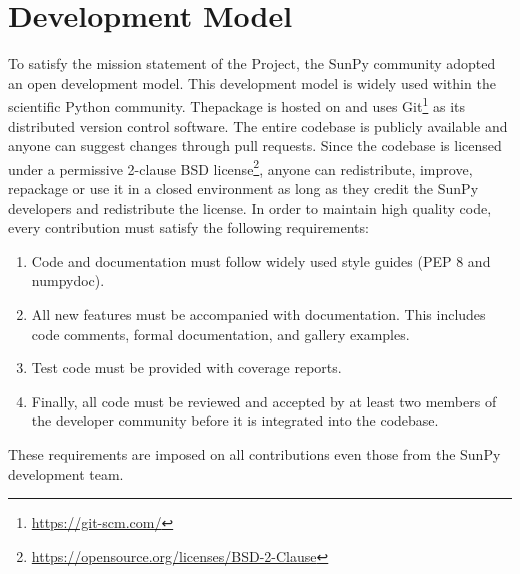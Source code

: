\section{Development Model}
\label{sec:development}

To satisfy the mission statement of the Project, the SunPy community adopted an open development model.
This development model is widely used within the scientific Python community.
The\sunpypkg package is hosted on \github and uses Git\footnote{\url{https://git-scm.com/}} as its distributed version control software.
The entire codebase is publicly available and anyone can suggest changes through pull requests.
Since the codebase is licensed under a permissive 2-clause BSD license\footnote{\url{https://opensource.org/licenses/BSD-2-Clause}}, anyone can redistribute, improve, repackage or use it in a closed environment as long as they credit the SunPy developers and redistribute the license.
In order to maintain high quality code, every contribution must satisfy the following requirements:
\begin{enumerate}
    \item Code and documentation must follow widely used style guides (PEP 8 and numpydoc).
    \item All new features must be accompanied with documentation.
    This includes code comments, formal documentation, and gallery examples.
    \item Test code must be provided with coverage reports.
    \item Finally, all code must be reviewed and accepted by at least two members of the developer community before it is integrated into the codebase.
\end{enumerate}
These requirements are imposed on all contributions even those from the SunPy development team.

